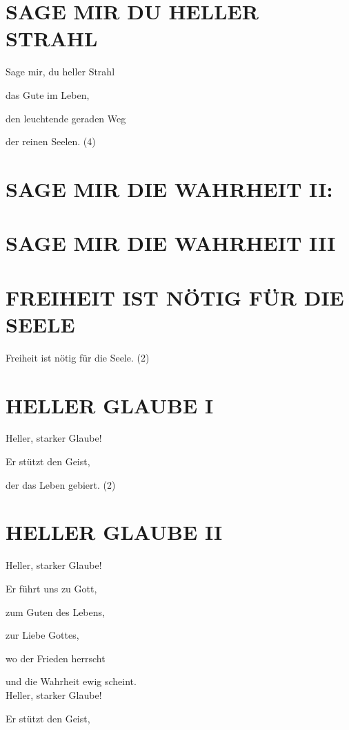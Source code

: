 \documentclass[11pt,a5paper,twoside]{article}
\begin{document}
\section[Sage mir du heller Strahl]{SAGE MIR DU HELLER STRAHL}

Sage mir, du heller Strahl 

das Gute im Leben, 

den leuchtende geraden Weg 

der reinen Seelen. (4)

\section[Sage mir die Wahrheit II]{SAGE MIR DIE WAHRHEIT II:}

\section[Sage mir die Wahrheit III]{SAGE MIR DIE WAHRHEIT III}

\section[Freiheit ist nötig für die Seele]{FREIHEIT IST NÖTIG FÜR DIE SEELE}

Freiheit ist nötig für die Seele. (2)

\section[Heller Glaube I]{HELLER GLAUBE I}
 
Heller, starker Glaube!

Er stützt den Geist, 

der das Leben gebiert. (2)

\section[Heller Glaube II]{HELLER GLAUBE II}

Heller, starker Glaube!

Er führt uns zu Gott, 

zum Guten des Lebens,

zur Liebe Gottes,

wo der Frieden herrscht 

und die Wahrheit ewig scheint.\\


Heller, starker Glaube!
 
Er stützt den Geist, 
\end{document}
